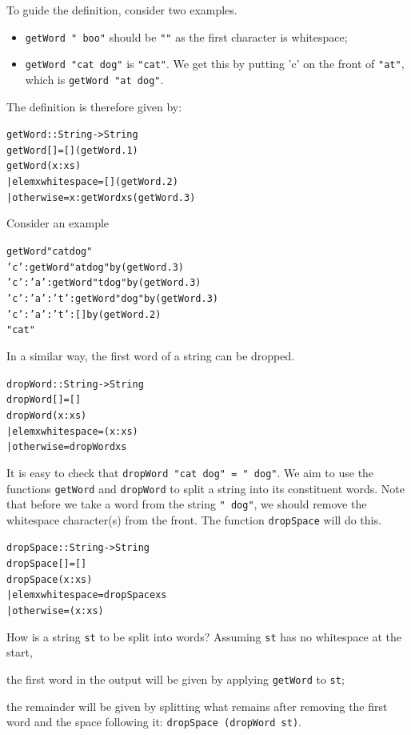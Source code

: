 To guide the
definition, consider two examples.
\begin{itemize}
\item \texttt{getWord " boo"} should be \texttt{""} as the first character is
whitespace;
\item \texttt{getWord "cat dog"} is \texttt{"cat"}. We get this by putting {\mi
'c'} on the front of \texttt{"at"}, which is \texttt{getWord "at dog"}.
\end{itemize}
The definition is therefore given by:
\begin{alltt}
getWord :: String -> String
getWord []    = [] \hfill (getWord.1)
getWord (x:xs) 
  | elem x whitespace   = []\hfill(getWord.2)
  | otherwise           = x : getWord xs\hfill (getWord.3)
\end{alltt}
Consider an example
\begin{alltt}
getWord "cat dog"
\step 'c' : getWord "at dog" \hfill {\rm by} (getWord.3)
\step 'c' : 'a' : getWord "t dog" \hfill {\rm by} (getWord.3)
\step 'c' : 'a' : 't' : getWord " dog" \hfill {\rm by} (getWord.3)
\step 'c' : 'a' : 't' : [] \hfill {\rm by} (getWord.2)
\step "cat"
\end{alltt}
In a similar way, the first word of a string can be dropped.
\begin{alltt}
dropWord :: String -> String
dropWord []    = []
dropWord (x:xs) 
  | elem x whitespace   = (x:xs)
  | otherwise           = dropWord xs
\end{alltt}
It is easy to check that \texttt{dropWord "cat dog" = " dog"}. We aim to
use the functions \texttt{getWord} and \texttt{dropWord} to split a string
into its constituent words. Note that before we take a word from the
string \texttt{" dog"}, we should remove the whitespace character(s) from the
front. The function \texttt{dropSpace} will do this.
\begin{alltt}
dropSpace :: String -> String
dropSpace []    = []
dropSpace (x:xs) 
  | elem x whitespace   = dropSpace xs
  | otherwise           = (x:xs)
\end{alltt}
How is a string \texttt{st} to be split into words? Assuming \texttt{st} has no
whitespace at the start,
\begin{titemize}
\item the first word in the output will be given by applying \texttt{getWord} to
\texttt{st};
\item the remainder will be given by splitting what remains after removing
the first word and the space following it:
\texttt{dropSpace (dropWord st)}.
\end{titemize}
